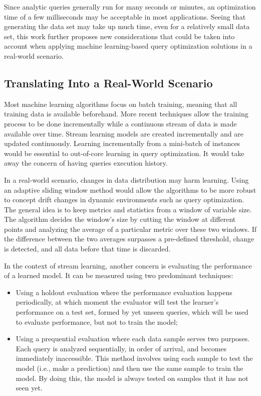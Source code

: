 Since analytic queries generally run for many seconds or minutes, an optimization time of a few milliseconds may be acceptable in most applications. Seeing that generating the data set may take up much time, even for a relatively small data set, this work further proposes new considerations that could be taken into account when applying machine learning-based query optimization solutions in a real-world scenario.

\subsection{Translating Into a Real-World Scenario}

Most machine learning algorithms focus on batch training, meaning that all training data is available beforehand. More recent techniques allow the training process to be done incrementally while a continuous stream of data is made available over time. Stream learning models are created incrementally and are updated continuously. Learning incrementally from a mini-batch of instances would be essential to out-of-core learning in query optimization. It would take away the concern of having queries execution history.

In a real-world scenario, changes in data distribution may harm learning. Using an adaptive sliding window method would allow the algorithms to be more robust to concept drift changes in dynamic environments such as query optimization. The general idea is to keep metrics and statistics from a window of variable size. The algorithm decides the window's size by cutting the window at different points and analyzing the average of a particular metric over these two windows. If the difference between the two averages surpasses a pre-defined threshold, change is detected, and all data before that time is discarded.

In the context of stream learning, another concern is evaluating the performance of a learned model. It can be measured using two predominant techniques:

\begin{itemize}
    \item Using a holdout evaluation where the performance evaluation happens periodically, at which moment the evaluator will test the learner's performance on a test set, formed by yet unseen queries, which will be used to evaluate performance, but not to train the model;
    \item Using a prequential evaluation where each data sample serves two purposes. Each query is analyzed sequentially, in order of arrival, and becomes immediately inaccessible. This method involves using each sample to test the model (i.e., make a prediction) and then use the same sample to train the model. By doing this, the model is always tested on samples that it has not seen yet.
\end{itemize}

